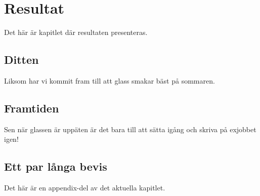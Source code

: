 \chapter{Resultat}\label{cha:Research}
%
Det här är kapitlet där resultaten presenteras.


\section{Ditten}\label{sec:research:history}
%
Liksom \citep{Duck:2005} har vi kommit fram till att glass smakar bäst på sommaren.




\section{Framtiden}

Sen när glassen är uppäten är det bara till att sätta igång och skriva på exjobbet igen!


\begin{chapter-appendix}

\section{Ett par långa bevis}
%
Det här är en appendix-del av det aktuella kapitlet.

\end{chapter-appendix}
